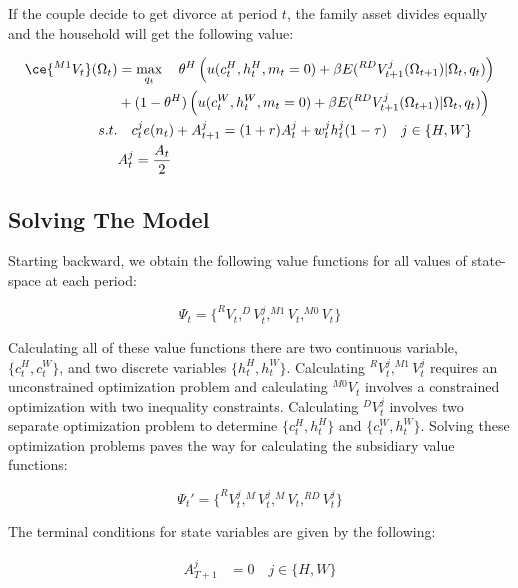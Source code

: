 If the couple decide to get divorce at period $t$, the family asset divides equally and the household will get the following value:

\begin{align*}
\ce{^{M1}V_t}(\Omega_t)  &= \max_{q_t} \quad  \theta^H \left ( u(c_t^H, h_t^H, m_t =0)  + \beta E(^{RD}V^j_{t+1} (\Omega_{t+1})| \Omega_t, q_t) \right) \\
  & + (1 - \theta^H) \left ( u(c_t^W, h_t^W, m_t = 0) + \beta E(^{RD}V^j_{t+1} (\Omega_{t+1})| \Omega_t, q_t) \right )\\
s.t. & \quad   c_t^j e(n_t) + A_{t+1}^j = (1+r) A_t^j + w_t^j h_t^j (1 - \tau) \quad j \in \{H, W\} \\
& A_t ^j = \dfrac{A_t}{2}
\end{align*}
 
\subsection{Solving The Model}

Starting backward, we obtain the following value functions for all values of state-space at each period:

\begin{equation*}
\Psi_t =\{ ^{R}V_t, ^DV^j_t, ^{M1}V_t, ^{M0}V_t\}
\end{equation*}

\noindent Calculating all of these value functions there are two continuous variable, $\{c_t^H, c_t^W\}$, and two discrete variables $\{h_t^H, h_t^W\}$. Calculating $^RV_t^j, ^{M1}V_t^j$ requires an unconstrained optimization problem and  calculating $^{M0}V_t$ involves a constrained optimization with two inequality constraints. Calculating $^DV_t^j$ involves two separate optimization problem to determine $\{c_t^H, h_t^H\}$ and $\{c_t^W, h_t^W\}$.  Solving these optimization problems paves the way for calculating the subsidiary value functions:

\begin{equation*}
\Psi_t'  =\{ ^{R}V_t^j, ^MV^j_t, ^{M}V_t, ^{RD}V_t^j\}
\end{equation*}

\noindent The terminal conditions for state variables are given by the following: 

\begin{align*}
A_{T+1}^j &= 0  \quad j \in \{H, W\} \\ 
\end{align*}





\clearpage



